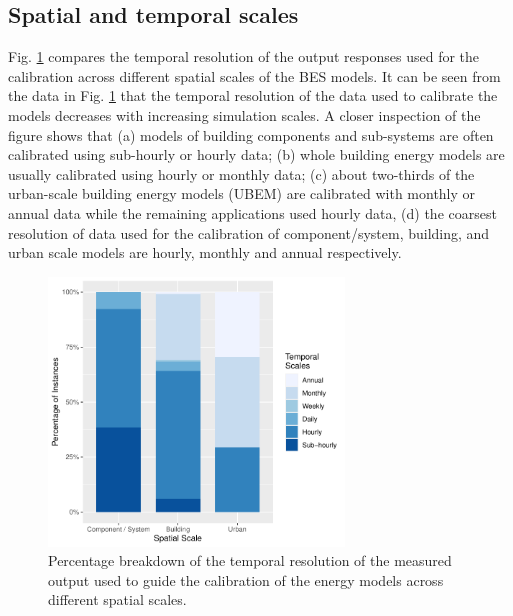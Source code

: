 \documentclass[review]{elsarticle}
\begin{document}
\begin{table}[h!]
\caption{Simulation engines used in the reviewed calibration applications ($N=107$).} 
\label{tab:sim_engine}
\centering
{}
\end{table}

\subsection{Spatial and temporal scales}

Fig. \ref{fig:spatial_temporal} compares the temporal resolution of the output responses used for the calibration across different spatial scales of the BES models. It can be seen from the data in Fig. \ref{fig:spatial_temporal} that the temporal resolution of the data used to calibrate the models decreases with increasing simulation scales. A closer inspection of the figure shows that (a) models of building components and sub-systems are often calibrated using sub-hourly or hourly data; (b) whole building energy models are usually calibrated using hourly or monthly data; (c) about two-thirds of the urban-scale building energy models (UBEM) are calibrated with monthly or annual data while the remaining applications used hourly data, (d) the coarsest resolution of data used for the calibration of component/system, building, and urban scale models are hourly, monthly and annual respectively. 

\begin{figure}[!h]
\centering
\includegraphics[width=0.7\textwidth]{figures/spatial_temporal_stacked.pdf}
\caption{Percentage breakdown of the temporal resolution of the measured output used to guide the calibration of the energy models across different spatial scales.}
\label{fig:spatial_temporal}
\end{figure}
\end{document}
